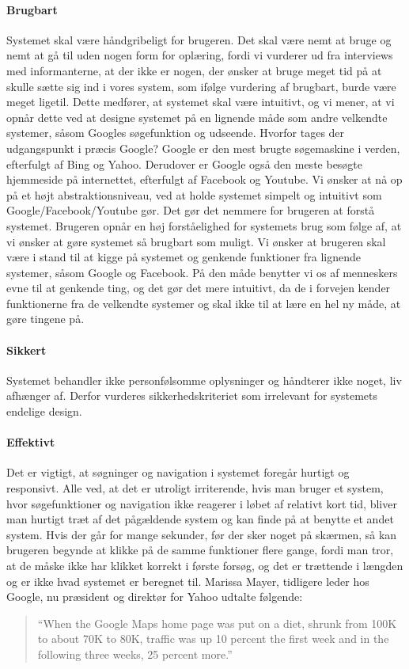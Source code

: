 \paragraph{Brugbart} Systemet skal være håndgribeligt for brugeren. Det skal være nemt at bruge og nemt at gå til uden nogen form for oplæring, fordi vi vurderer ud fra interviews med informanterne, at der ikke er nogen, der ønsker at bruge meget tid på at skulle sætte sig ind i vores system, som ifølge vurdering af brugbart, burde være meget ligetil. Dette medfører, at systemet skal være intuitivt, og vi mener, at vi opnår dette ved at designe systemet på en lignende måde som andre velkendte systemer, såsom Googles søgefunktion og udseende. Hvorfor tages der udgangspunkt i præcis Google? Google er den mest brugte søgemaskine i verden, efterfulgt af Bing og Yahoo.\cite{googlesoeg} \cite{ebizmba} Derudover er Google også den meste besøgte hjemmeside på internettet, efterfulgt af Facebook og Youtube. \cite{alexadk} Vi ønsker at nå op på et højt abstraktionsniveau, ved at holde systemet simpelt og intuitivt som Google/Facebook/Youtube gør. Det gør det nemmere for brugeren at forstå systemet. Brugeren opnår en høj forståelighed for systemets brug som følge af, at vi ønsker at gøre systemet så brugbart som muligt. Vi ønsker at brugeren skal være i stand til at kigge på systemet og genkende funktioner fra lignende systemer, såsom Google og Facebook. På den måde benytter vi os af menneskers evne til at genkende ting, og det gør det mere intuitivt, da de i forvejen kender funktionerne fra de velkendte systemer og skal ikke til at lære en hel ny måde, at gøre tingene på.

\paragraph{Sikkert} Systemet behandler ikke personfølsomme oplysninger og håndterer ikke noget, liv afhænger af. Derfor vurderes sikkerhedskriteriet som irrelevant for systemets endelige design.

\paragraph{Effektivt} Det er vigtigt, at søgninger og navigation i systemet foregår hurtigt og responsivt. Alle ved, at det er utroligt irriterende, hvis man bruger et system, hvor søgefunktioner og navigation ikke reagerer i løbet af relativt kort tid, bliver man hurtigt træt af det pågældende system og kan finde på at benytte et andet system. Hvis der går for mange sekunder, før der sker noget på skærmen, så kan brugeren begynde at klikke på de samme funktioner flere gange, fordi man tror, at de måske ikke har klikket korrekt i første forsøg, og det er trættende i længden og er ikke hvad systemet er beregnet til. Marissa Mayer, tidligere leder hos Google, nu præsident og direktør for Yahoo udtalte følgende: \cite{googlespeed}
\begin{quote}
``When the Google Maps home page was put on a diet, shrunk from 100K to about 70K to 80K, traffic was up 10 percent the first week and in the following three weeks, 25 percent more.''
\end{quote}  

